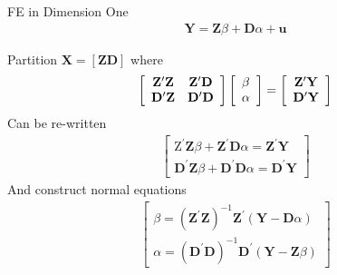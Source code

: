 \documentclass[aspectratio=169]{beamer}
\begin{document}
\begin{frame}{FE in Dimension One}
\begin{align*}
\mathbf{Y} = \mathbf{Z} \beta + \mathbf{D} \alpha + \mathbf{u}
\end{align*}

Partition $\mathbf{X} = [\mathbf{Z} \mathbf{D}]$ where
\begin{align*}
\left[ \begin{array} { c c } { \mathbf { Z } ^ { \prime } \mathbf { Z } } & { \mathbf { Z } ^ { \prime } \mathbf { D } } \\ { \mathbf { D } ^ { \prime } \mathbf { Z } } & { \mathbf { D } ^ { \prime } \mathbf { D } } \end{array} \right] \left[ \begin{array} { l } { \beta } \\ { \alpha } \end{array} \right] = \left[ \begin{array} { c } { \mathbf { Z } ^ { \prime } \mathbf { Y } } \\ { \mathbf { D } ^ { \prime } \mathbf { Y } } \end{array} \right]\\
\end{align*}
Can be re-written
\begin{align*}
\left[ \begin{array} { c } { \mathrm { Z } ^ { \prime } \mathbf { Z } \beta + \mathbf { Z } ^ { \prime } \mathbf { D } \alpha = \mathbf { Z } ^ { \prime } \mathbf { Y } } \\ { \mathbf { D } ^ { \prime } \mathbf { Z } \beta + \mathbf { D } ^ { \prime } \mathbf { D } \alpha = \mathbf { D } ^ { \prime } \mathbf { Y } } \end{array} \right]
\end{align*}
And construct \alert{normal equations}
\begin{align*}
\left[ \begin{array} { c } { \beta = \left( \mathbf { Z } ^ { \prime } \mathbf { Z } \right) ^ { - 1 } \mathbf { Z } ^ { \prime } ( \mathbf { Y } - \mathbf { D } \alpha ) } \\ { \alpha = \left( \mathbf { D } ^ { \prime } \mathbf { D } \right) ^ { - 1 } \mathbf { D } ^ { \prime } ( \mathbf { Y } - \mathbf { Z } \beta ) } \end{array} \right]
\end{align*}
\end{frame}
\end{document}
